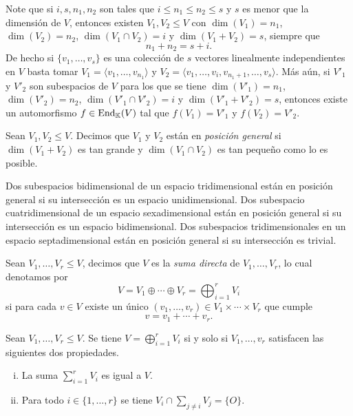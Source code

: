 \begin{obs}
Note que si $i,s,n_1,n_2$ son tales que $i\le n_1\le n_2\le s$ y $s$ es menor que la dimensi\'on de $V$, entonces existen $V_1,V_2\le V$ con $\dim(V_1)=n_1$, $\dim(V_2)=n_2$, $\dim(V_1\cap V_2)=i$ y $\dim(V_1+V_2)=s$, siempre que
\[
n_1+n_2=s+i.
\]
De hecho si $\{v_1,\ldots,v_s\}$ es una colecci\'on de $s$ vectores linealmente independientes en $V$ basta tomar
$V_1=\langle v_1,\ldots,v_{n_1}\rangle$ y  $V_2=\langle v_1,\ldots,v_i,v_{n_1+1},\ldots,v_s\rangle$.
M\'as a\'un, si $V'_1$ y $V'_2$ son subespacios de $V$ para los que se tiene $\dim(V'_1)=n_1$, $\dim(V'_2)=n_2$, $\dim(V'_1\cap V'_2)=i$ y $\dim(V'_1+V'_2)=s$, entonces existe un automorfismo $f\in\operatorname{End}_\mathbb{K}(V)$ tal que $f(V_1)=V'_1$ y $f(V_2)=V'_2$.
\end{obs}

\begin{defn}
Sean $V_1,V_2\le V$. Decimos que $V_1$ y $V_2$ est\'an en \emph{posici\'on general} si $\dim(V_1+V_2)$ es tan grande y $\dim(V_1\cap V_2)$ es tan peque\~no como lo es posible.
\end{defn}

\begin{ejem}
Dos subespacios bidimensional de un espacio tridimensional est\'an en posici\'on general si su intersecci\'on es un espacio unidimensional. Dos subespacio cuatridimensional de un espacio sexadimensional est\'an en posici\'on general si su intersecci\'on es un espacio bidimensional. Dos subespacios tridimensionales en un espacio septadimensional est\'an en posici\'on general si su intersecci\'on es trivial.
\end{ejem}

\begin{defn}
Sean $V_1,\ldots,V_r\le V$, decimos que $V$ es la \emph{suma directa} de $V_1,\ldots,V_r$, lo cual denotamos por
\[
V=V_1\oplus\cdots\oplus V_r=\bigoplus_{i=1}^r V_i
\]
si para cada $v\in V$ existe un \'unico $(v_1,\ldots,v_r)\in V_1\times\cdots\times V_r$ que cumple
\[
v=v_1+\cdots+v_r.
\]
\end{defn}

\begin{prop}\label{sumadirsiysolosi}
Sean $V_1,\ldots,V_r\le V$. Se tiene $V=\bigoplus_{i=1}^r V_i$ si y solo si $V_1,\ldots,v_r$ satisfacen las siguientes dos propiedades.
\begin{enumerate}[(i)]
\item La suma $\sum_{i=1}^r V_i$ es igual a $V$.
\item Para todo $i\in\{1,\ldots,r\}$ se tiene $V_i\cap\sum_{j\ne i} V_j=\{O\}$.
\end{enumerate}
\end{prop}

